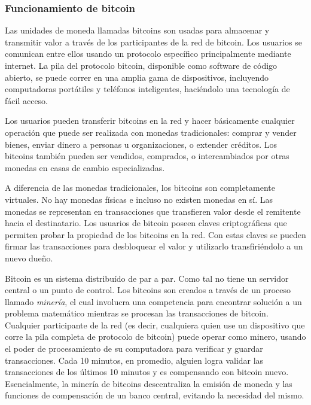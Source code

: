 \subsubsection{Funcionamiento de bitcoin}

Las unidades de moneda llamadas bitcoins son usadas para almacenar y transmitir valor a través
de los participantes de la red de bitcoin. Los usuarios se comunican entre ellos usando un protocolo 
específico principalmente mediante internet. La pila del
protocolo bitcoin, disponible como software de código abierto, se puede correr en una amplia gama de
dispositivos, incluyendo computadoras portátiles y teléfonos inteligentes, haciéndolo una tecnología
de fácil acceso.

Los usuarios pueden transferir bitcoins en la red y hacer básicamente cualquier operación que puede ser
realizada con monedas tradicionales: comprar y vender bienes, enviar dinero a personas u
organizaciones, o extender créditos. Los bitcoins también pueden ser vendidos, comprados, o intercambiados por
otras monedas en casas de cambio especializadas.

A diferencia de las monedas tradicionales, los bitcoins son completamente virtuales. No hay monedas
físicas e incluso no existen monedas en sí. Las monedas se representan en transacciones que transfieren
valor desde el remitente hacia el destinatario. Los usuarios de bitcoin poseen claves criptográficas
que permiten probar la propiedad de los bitcoins en la red. Con estas claves se pueden firmar las
transacciones para desbloquear el valor y utilizarlo transfiriéndolo a un nuevo dueño. 

Bitcoin es un sistema distribuído de par a par. Como tal no tiene un servidor central o un punto de control.
Los bitcoins son creados a través de un proceso llamado \textit{minería}, el cual involucra una competencia
para encontrar solución a un problema matemático mientras se procesan las transacciones de bitcoin.
Cualquier participante de la red (es decir, cualquiera quien use un dispositivo que corre la pila
completa de protocolo de bitcoin) puede operar como minero, usando el poder de procesamiento de su
computadora para verificar y guardar transacciones. Cada 10 minutos, en promedio, alguien logra validar
las transacciones de los últimos 10 minutos y es compensando con bitcoin nuevo. Esencialmente, la minería
de bitcoins descentraliza la emisión de moneda y las funciones de compensación de un banco central, evitando
la necesidad del mismo.

